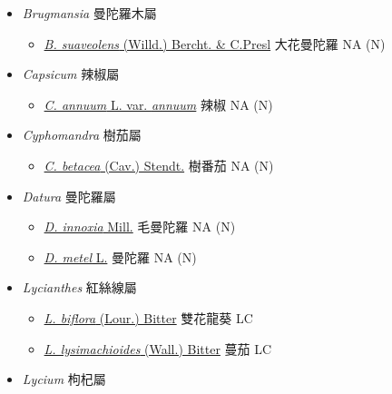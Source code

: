 
  \begin{itemize}
 \item[] \textit{Brugmansia} 曼陀羅木屬
                                
  \begin{itemize}
        \item[] \href{http://www.theplantlist.org/tpl1.1/search?q=Brugmansia+suaveolens}{\textit{B. suaveolens} (Willd.) Bercht. \& C.Presl}   大花曼陀羅   NA (N)
  \end{itemize}
 \item[] \textit{Capsicum} 辣椒屬
                                
  \begin{itemize}
        \item[] \href{http://www.theplantlist.org/tpl1.1/search?q=Capsicum+annuum+var.+annuum}{\textit{C. annuum} L. var. \textit{annuum}}   辣椒   NA (N)
  \end{itemize}
 \item[] \textit{Cyphomandra} 樹茄屬
                                
  \begin{itemize}
        \item[] \href{http://www.theplantlist.org/tpl1.1/search?q=Cyphomandra+betacea}{\textit{C. betacea} (Cav.) Stendt.}   樹番茄   NA (N)
  \end{itemize}
 \item[] \textit{Datura} 曼陀羅屬
                                
  \begin{itemize}
        \item[] \href{http://www.theplantlist.org/tpl1.1/search?q=Datura+innoxia}{\textit{D. innoxia} Mill.}   毛曼陀羅   NA (N)
        \item[] \href{http://www.theplantlist.org/tpl1.1/search?q=Datura+metel}{\textit{D. metel} L.}   曼陀羅   NA (N)
  \end{itemize}
 \item[] \textit{Lycianthes} 紅絲線屬
                                
  \begin{itemize}
        \item[] \href{http://www.theplantlist.org/tpl1.1/search?q=Lycianthes+biflora}{\textit{L. biflora} (Lour.) Bitter}   雙花龍葵   LC
        \item[] \href{http://www.theplantlist.org/tpl1.1/search?q=Lycianthes+lysimachioides}{\textit{L. lysimachioides} (Wall.) Bitter}   蔓茄   LC
  \end{itemize}
 \item[] \textit{Lycium} 枸杞屬
                                

\end{itemize}
